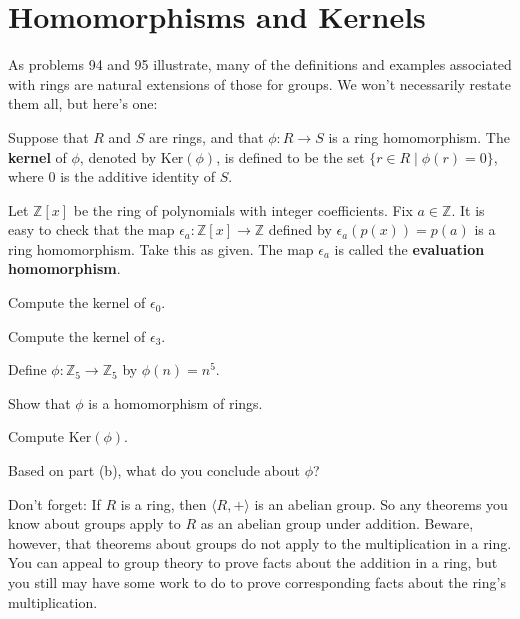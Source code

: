 \section{Homomorphisms and Kernels}
As problems 94 and 95 illustrate, many of the definitions and examples associated with rings are natural extensions of those for groups. We won't necessarily restate them all, but here's one:

\begin{definition}
Suppose that \(R\) and \(S\) are rings, and that \(\phi : R \longrightarrow S\) is a ring homomorphism. The \textbf{kernel} of \(\phi\), denoted by \(\mbox{Ker}( \phi )\), is defined to be the
set \(\{r \in R \mid \phi(r) = 0 \} \), where \(0\) is the additive identity of \(S\).
\end{definition}

\begin{problem}
Let \(\mathbb{Z}[x]\)  be the ring of polynomials with integer coefficients. Fix \(a\in \mathbb{Z}\). It is easy to check that the map \(\epsilon_a : \mathbb{Z}[x] \longrightarrow \mathbb{Z}\) defined by \(\epsilon_a(p(x)) = p(a)\) is a ring homomorphism. Take this as given. The map \(\epsilon_a\) is called the \textbf{evaluation homomorphism}.
\begin{problemparts}
  \item Compute the kernel of \(\epsilon_0\).
  \item Compute the kernel of \(\epsilon_3\).
\end{problemparts}
\end{problem}

\begin{problem}\label{prob:ringkern}
Define \(\phi:\mathbb{Z}_5\longrightarrow \mathbb{Z}_5\) by \(\phi(n)=n^5\).
\begin{problemparts}
  \item Show that \(\phi\) is a homomorphism of rings.
  \item Compute \(\mbox{Ker}(\phi)\).
  \item Based on part (b), what do you conclude about \(\phi\)?
\begin{annotation}
\end{annotation}
\end{problemparts}
\end{problem}

Don't forget: If \(R\) is a ring, then \(\langle R, +\rangle\) is an abelian group. So any theorems you know about groups apply to \(R\) as an abelian group under addition. Beware, however, that theorems about groups do not apply to the multiplication in a ring. You can appeal to group theory to prove facts about the addition in a ring, but you still may have some work to do to prove corresponding facts about the ring's multiplication.

